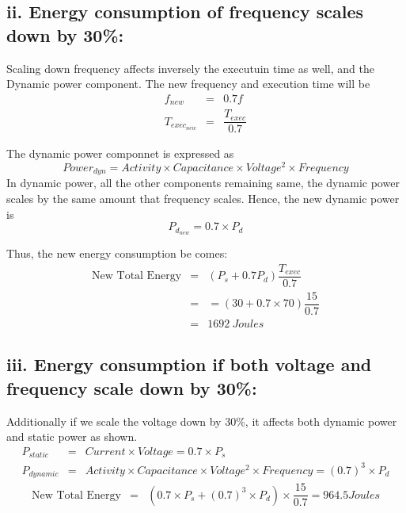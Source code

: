 \documentclass{tufte-handout}
\begin{document}
	\subsection{ii. Energy consumption of frequency scales down by 30\%:}
		Scaling down frequency affects inversely the executuin time as well, and the Dynamic power component.
		The new frequency and execution time will be
		\begin{eqnarray*}
			f_{new} &=& 0.7 f \\
			T_{exec_{new}} &=& \dfrac{T_{exec}}{0.7} 
		\end{eqnarray*}

		The dynamic power componnet is expressed as 
		\[
			Power_{dyn} = Activity \times Capacitance \times Voltage^2 \times Frequency
		\]
		In dynamic power, all the other components remaining same, the dynamic power scales by the same amount that frequency scales.
		Hence, the new dynamic power is
		\[
			P_{d_{new}} = 0.7 \times P_d
		\]

		Thus, the new energy consumption be comes:
		\begin{eqnarray*}
			\mbox{New Total Energy} &=& (P_s + 0.7 P_d) \dfrac{T_{exec}}{0.7} \\
			&=& = (30 + 0.7 \times 70) \dfrac{15}{0.7} \\
			&=& 1692\ Joules
		\end{eqnarray*}


	\subsection{iii. Energy consumption if both voltage and frequency scale down by 30\%:}
	Additionally if we scale the voltage down by $30\%$, it affects both dynamic power and static power as shown.  
	\begin{eqnarray*}
		P_{static} &=& Current \times Voltage = 0.7 \times P_s \\
		P_{dynamic} &=& Activity \times Capacitance \times Voltage^2 \times Frequency = (0.7)^3 \times P_d
	\end{eqnarray*}
	\begin{eqnarray*}
		\mbox{New Total Energy} &=& ( 0.7 \times P_s + (0.7)^3 \times P_d) \times \dfrac{15}{0.7} = 964.5 Joules
	\end{eqnarray*}

\newpage
\end{document}
